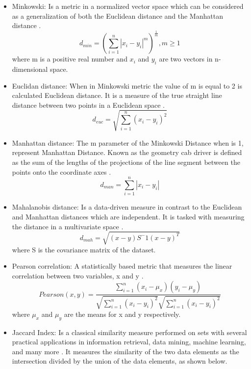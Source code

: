 \begin{itemize}
  \item Minkowski: Is a metric in a normalized vector space which can be considered as a generalization of both the Euclidean distance and the Manhattan distance \citep{b56}.
    \begin{equation}
        d_{min} = (\sum_{i=1}^{n}|x_i - y_i|^m)^\frac{1}{m}, m\geq 1
    \end{equation}
    where m is a positive real number and $x_i$ and $y_i$ are two vectors in n-dimensional space.
    \item Euclidan distance: When in Minkowski metric the value of m is equal to 2 is calculated Euclidean distance. It is a measure of the true straight line distance between two points in a Euclidean space \citep{R:jain-murty-flynn:1999}.
    \begin{equation}
        d_{euc} =  \sqrt{\sum_{i=1}^{n}(x_{i}-y_{i})^2}
    \end{equation}
     \item Manhattan distance: The m parameter of the Minkowski Distance when is 1, represent Manhattan Distance. Known as the geometry cab driver is defined as the sum of the lengths of the projections of the line segment between the points onto the coordinate axes \citep{b58}.
     \begin{equation}
        d_{man} =  \sum_{i=1}^{n}|x_{i}-y_{i}|
    \end{equation}
    \item Mahalanobis distance: Is a data-driven measure in contrast to the Euclidean and Manhattan distances which are independent. It is tasked with measuring the distance in a multivariate space \citep{b58}.
    \begin{equation}
        d_{mah}= \sqrt{(x-y)S^-1(x-y)^T}
    \end{equation}
    where S is the covariance matrix of the dataset.
    \item Pearson correlation: A statistically based metric that measures the linear correlation between two variables, x and y \citep{b61}.
    \begin{equation}
        Pearson(x,y)= \frac{\sum_{i=1}^n(x_i-\mu_x)(y_i-\mu_y)}{\sqrt{\sum_{i=1}^n(x_i-y_i)^2}\sqrt{\sum_{i=1}^n(x_i-y_i)^2}}
    \end{equation}
    where $\mu_x$ and $\mu_y$ are the means for x and y respectively.
    \item Jaccard Index: Is a classical similarity measure performed on sets with several practical applications in information retrieval, data mining, machine learning, and many more \citep{R:sven:2016} \citep{b59}. It measures the similarity of the two data elements as the intersection divided by the union of the data elements, as shown below.

\end{itemize}
